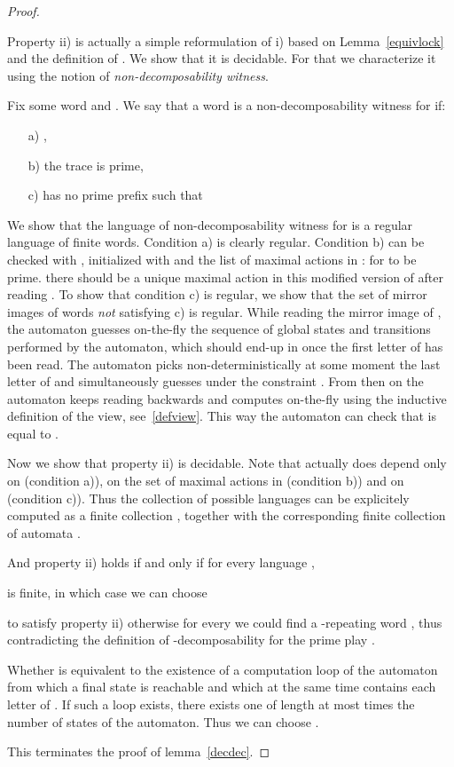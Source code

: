 \documentclass[a4paper,UKenglish]{lipics-v2016}
\begin{document}
\begin{proof}
\begin{itemize}
\end{itemize}

Property ii) is actually a simple reformulation of i)
 based on Lemma~\ref{equivlock} and the definition of .
 We show that it is decidable. For that we characterize it using the notion of \emph{non-decomposability witness}.

Fix some word  and . We say that a word  is a non-decomposability witness for 
if:
\begin{itemize}
\item[a)]
,
\item[b)]
the trace  is prime,
\item[c)]
 has no prime prefix  such that

\end{itemize}

We show that the language  of non-decomposability witness for  is a regular language of finite words.
Condition a) is clearly regular.
Condition b) can be checked with ,
initialized with  and the list of maximal actions in :
for  to be prime.
there should be a unique maximal action in this modified version of 
after reading .
To show that condition c) is regular,
we show that the set of mirror images of words  \emph{not} satisfying c) is regular.
While reading the mirror image of ,
the automaton guesses on-the-fly
the sequence of global states and transitions performed by the automaton,
which should end-up in  once the first letter of  has been read.
The automaton picks non-deterministically at some moment the last letter  of  and
simultaneously guesses 
under the constraint 
.
From then on the automaton keeps reading  backwards
and computes on-the-fly  
using the inductive definition of the view, see~\eqref{defview}.
This way the automaton can check that  is equal to
.


\medskip

Now we show that property ii) is decidable.
Note that  actually does depend only on  (condition a)),
on the set of maximal actions in  (condition b)) and on
 (condition c)).
Thus the collection of possible languages  can be explicitely computed
as a finite collection ,
together with the corresponding finite collection of automata .

And property ii) holds if and only if
for every language ,

is finite, in which case we can choose

to satisfy property ii) otherwise for every  we could find a -repeating word ,
thus contradicting the definition of 
-decomposability for the prime play .

Whether 
is equivalent to the existence of a computation loop of the automaton   from which a final state is reachable
and which at the same time contains each letter of .
If such a loop exists, there exists one of length at most  times the number of states of the automaton.
Thus we can choose .

This terminates the proof of lemma~\ref{decdec}.
\end{proof}
\end{document}
